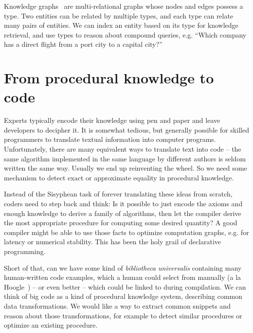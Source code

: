 \documentclass[11pt]{article}
\begin{document}
    Knowledge graphs~\citep{hogan2020knowledge} are multi-relational graphs whose nodes and edges possess a type. Two entities can be related by multiple types, and each type can relate many pairs of entities. We can index an entity based on its type for knowledge retrieval, and use types to reason about compound queries, e.g. ``Which company has a direct flight from a port city to a capital city?''

%

    \pagebreak


    \section{From procedural knowledge to code}\label{sec:applications}

    Experts typically encode their knowledge using pen and paper and leave developers to decipher it. It is somewhat tedious, but generally possible for skilled programmers to translate textual information into computer programs. Unfortunately, there are many equivalent ways to translate text into code -- the same algorithm implemented in the same language by different authors is seldom written the same way. Usually we end up reinventing the wheel. So we need some mechanism to detect exact or approximate equality in procedural knowledge.

    Instead of the Sisyphean task of forever translating these ideas from scratch, coders need to step back and think: Is it possible to just encode the axioms and enough knowledge to derive a family of algorithms, then let the compiler derive the most appropriate procedure for computing some desired quantity? A good compiler might be able to use those facts to optimize computation graphs, e.g. for latency or numerical stability. This has been the holy grail of declarative programming.

    Short of that, can we have some kind of \textit{bibliotheca universalis} containing many human-written code examples, which a human could select from manually (a la Hoogle~\citep{james2020digging}) -- or even better -- which could be linked to during compilation. We can think of big code as a kind of procedural knowledge system, describing common data transformations. We would like a way to extract common snippets and reason about those transformations, for example to detect similar procedures or optimize an existing procedure.
\end{document}
